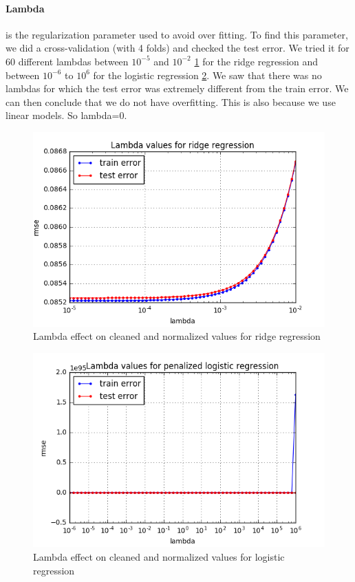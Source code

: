 \documentclass[10pt,conference,compsocconf]{IEEEtran}
\begin{document}
\paragraph{Lambda} is the regularization parameter used to avoid over fitting. To find this parameter, we did a cross-validation (with 4 folds) and checked the test error. We tried it for 60 different lambdas between $10^{-5}$ and $10^{-2}$  \ref{fig1} for the ridge regression and between $10^{-6}$ to $10^6$ for the logistic regression \ref{fig2}. We saw that there was no lambdas for which the test error was extremely different from the train error. We can then conclude that we do not have overfitting. This is also because we use linear models. So lambda=0.
\begin{figure}[tbp]
  \centering
  \includegraphics[width=\columnwidth]{Lambda values for ridge regression}
  \caption{Lambda effect on cleaned and normalized values for ridge regression}
  \vspace{-3mm}
  \label{fig1}
\end{figure}
\begin{figure}[tbp]
  \centering
  \includegraphics[width=\columnwidth]{Lambda values for penalized logistic regression}
  \caption{Lambda effect on cleaned and normalized values for logistic regression}
  \vspace{-3mm}
  \label{fig2}
\end{figure}
\end{document}
